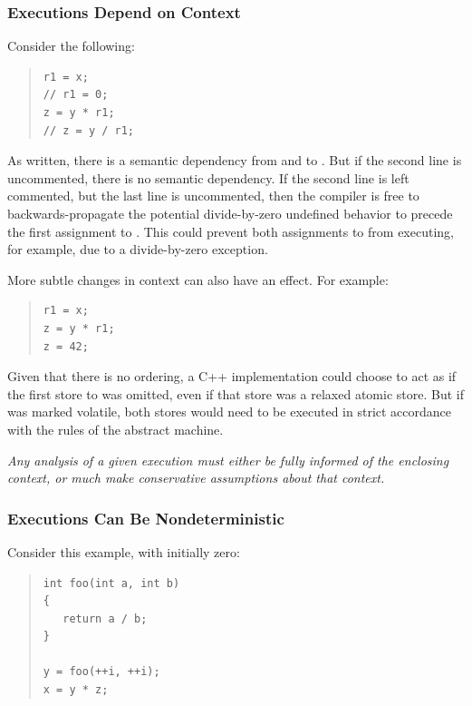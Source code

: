 \documentclass[10]{article}
\begin{document}
\subsubsection{Executions Depend on Context}
\label{sec:Executions Depend on Context}

Consider the following:

\begin{quote}
\begin{verbatim}
r1 = x;
// r1 = 0;
z = y * r1;
// z = y / r1;
\end{verbatim}
\end{quote}

As written, there is a semantic dependency from  and 
to .
But if the second line is uncommented, there is no semantic
dependency.
If the second line is left commented, but the last line is uncommented,
then the compiler is free to backwards-propagate the potential
divide-by-zero undefined behavior to precede the first assignment
to .
This could prevent both assignments to  from executing, for example,
due to a divide-by-zero exception.

More subtle changes in context can also have an effect.
For example:

\begin{quote}
\begin{verbatim}
r1 = x;
z = y * r1;
z = 42;
\end{verbatim}
\end{quote}

Given that there is no ordering, a C++ implementation could choose to
act as if the first store to  was omitted, even if that store was
a relaxed atomic store.
But if  was marked volatile, both stores would need to be executed
in strict accordance with the rules of the abstract machine.

\emph{Any analysis of a given execution must either be fully informed
of the enclosing context, or much make conservative assumptions about
that context.}

\subsubsection{Executions Can Be Nondeterministic}
\label{sec:Executions Can Be Nondeterministic}

Consider this example, with  initially zero:

\begin{quote}
\begin{verbatim}
int foo(int a, int b)
{
   return a / b;
}

y = foo(++i, ++i);
x = y * z;
\end{verbatim}
\end{quote}
\end{document}
